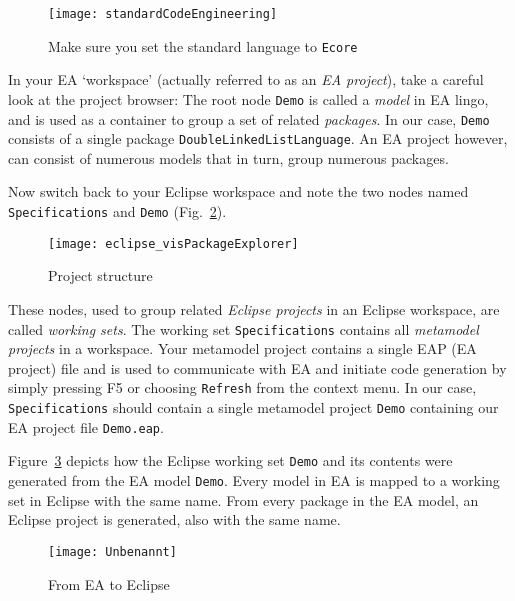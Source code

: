 
\begin{figure}[htbp]
    \centering
    \texttt{[image: standardCodeEngineering]}
    \caption{Make sure you set the standard language to \texttt{Ecore}}
    \label{fig_standardSCEEA}
 \end{figure}
 
\clearpage

In your EA `workspace' (actually referred to as an \emph{EA project}), take a careful  look at the project browser:  The root node \texttt{Demo} is called a
\emph{model} in EA lingo, and is used as a container to group a set of related \emph{packages}. In our case, \texttt{Demo}  consists of a single package
\texttt{DoubleLinkedListLanguage}. An EA project however, can consist of numerous models that in turn, group numerous packages.

Now switch back to your Eclipse workspace and note the two nodes named \texttt{Spe\-ci\-fi\-ca\-tions} and \texttt{Demo} (Fig.~\ref{fig_eclipsePS}).

\begin{figure}[htbp]
    \centering
    \texttt{[image: eclipse\_visPackageExplorer]}
    \caption{Project structure}
    \label{fig_eclipsePS}
 \end{figure}


These nodes, used to group related \emph{Eclipse projects} in an Eclipse workspace, are called \emph{working sets}. The working set
\texttt{Spe\-ci\-fi\-ca\-tions} contains all \emph{metamodel projects} in a  workspace. Your metamodel project contains a single EAP (EA project) file and is
used to communicate with EA and initiate code generation by simply pressing F5 or choosing \texttt{Refresh} from the context menu.
In our case, \texttt{Specifications} should contain a single metamodel project \texttt{Demo} containing our EA project file  \texttt{Demo.eap}.
 
Figure~\ref{fig_fromEAtoEclipse} depicts how the Eclipse working set \texttt{Demo} and its contents were generated from the EA model \texttt{Demo}. Every model
in EA is mapped to a working set in Eclipse with the same name. From every package in the EA model, an Eclipse project is generated, also with the same name.

\begin{figure}[htbp]
    \centering
  \texttt{[image: Unbenannt]}
    \caption{From EA to Eclipse}
    \label{fig_fromEAtoEclipse}
\end{figure}

